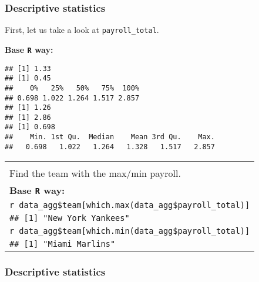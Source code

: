 \documentclass[
]{article}
\newenvironment{Shaded}{\begin{snugshade}}{\end{snugshade}}
\newcommand{\AttributeTok}[1]{\textcolor[rgb]{0.77,0.63,0.00}{#1}}
\newcommand{\DecValTok}[1]{\textcolor[rgb]{0.00,0.00,0.81}{#1}}
\newcommand{\FloatTok}[1]{\textcolor[rgb]{0.00,0.00,0.81}{#1}}
\newcommand{\FunctionTok}[1]{\textcolor[rgb]{0.00,0.00,0.00}{#1}}
\newcommand{\NormalTok}[1]{#1}
\newcommand{\SpecialCharTok}[1]{\textcolor[rgb]{0.00,0.00,0.00}{#1}}
\begin{document}
\frametitle{Descriptive statistics}

First, let us take a look at \texttt{payroll\_total}.

\textbf{Base \texttt{R} way:} \tiny

\begin{Shaded}
\end{Shaded}

\begin{verbatim}
## [1] 1.33
## [1] 0.45
##    0%   25%   50%   75%  100% 
## 0.698 1.022 1.264 1.517 2.857 
## [1] 1.26
## [1] 2.86
## [1] 0.698
##    Min. 1st Qu.  Median    Mean 3rd Qu.    Max. 
##   0.698   1.022   1.264   1.328   1.517   2.857
\end{verbatim}

\begin{longtable}[]{@{}
  >{\raggedleft\arraybackslash}p{}@{}}
\toprule
\endhead
 \\
Find the team with the max/min payroll. \\
\textbf{Base \texttt{R} way:} \tiny \\
\texttt{r\ data\_agg\$team{[}which.max(data\_agg\$payroll\_total){]}} \\
\texttt{\#\#\ {[}1{]}\ "New\ York\ Yankees"} \\
\texttt{r\ data\_agg\$team{[}which.min(data\_agg\$payroll\_total){]}} \\
\texttt{\#\#\ {[}1{]}\ "Miami\ Marlins"} \\
\bottomrule
\end{longtable}

\frametitle{Descriptive statistics}
\end{document}
